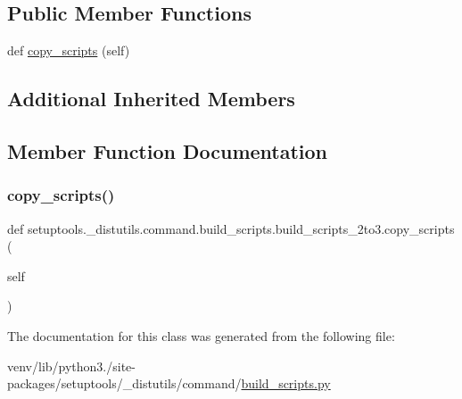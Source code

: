 \subsection*{Public Member Functions}
\begin{DoxyCompactItemize}
\item 
def \hyperlink{classsetuptools_1_1__distutils_1_1command_1_1build__scripts_1_1build__scripts__2to3_a27b7f628a0ee45e430206271b1e49fce}{copy\+\_\+scripts} (self)
\end{DoxyCompactItemize}
\subsection*{Additional Inherited Members}


\subsection{Member Function Documentation}
\mbox{\label{classsetuptools_1_1__distutils_1_1command_1_1build__scripts_1_1build__scripts__2to3_a27b7f628a0ee45e430206271b1e49fce}} 
\subsubsection{\texorpdfstring{copy\+\_\+scripts()}{copy\_scripts()}}
{\footnotesize\ttfamily def setuptools.\+\_\+distutils.\+command.\+build\+\_\+scripts.\+build\+\_\+scripts\+\_\+2to3.\+copy\+\_\+scripts (\begin{DoxyParamCaption}\item[{}]{self }\end{DoxyParamCaption})}



The documentation for this class was generated from the following file\+:\begin{DoxyCompactItemize}
\item 
venv/lib/python3./site-\/packages/setuptools/\+\_\+distutils/command/\hyperlink{setuptools_2__distutils_2command_2build__scripts_8py}{build\+\_\+scripts.\+py}\end{DoxyCompactItemize}
